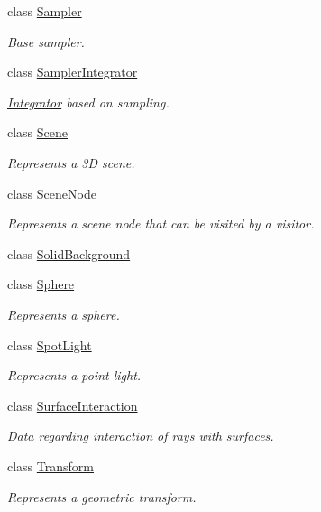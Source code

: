 \begin{DoxyCompactItemize}
class \mbox{\hyperlink{classomg_1_1_sampler}{Sampler}}
\begin{DoxyCompactList}\small\item\em Base sampler. \end{DoxyCompactList}\item 
class \mbox{\hyperlink{classomg_1_1_sampler_integrator}{Sampler\+Integrator}}
\begin{DoxyCompactList}\small\item\em \mbox{\hyperlink{classomg_1_1_integrator}{Integrator}} based on sampling. \end{DoxyCompactList}\item 
class \mbox{\hyperlink{classomg_1_1_scene}{Scene}}
\begin{DoxyCompactList}\small\item\em Represents a 3D scene. \end{DoxyCompactList}\item 
class \mbox{\hyperlink{classomg_1_1_scene_node}{Scene\+Node}}
\begin{DoxyCompactList}\small\item\em Represents a scene node that can be visited by a visitor. \end{DoxyCompactList}\item 
class \mbox{\hyperlink{classomg_1_1_solid_background}{Solid\+Background}}
\item 
class \mbox{\hyperlink{classomg_1_1_sphere}{Sphere}}
\begin{DoxyCompactList}\small\item\em Represents a sphere. \end{DoxyCompactList}\item 
class \mbox{\hyperlink{classomg_1_1_spot_light}{Spot\+Light}}
\begin{DoxyCompactList}\small\item\em Represents a point light. \end{DoxyCompactList}\item 
class \mbox{\hyperlink{classomg_1_1_surface_interaction}{Surface\+Interaction}}
\begin{DoxyCompactList}\small\item\em Data regarding interaction of rays with surfaces. \end{DoxyCompactList}\item 
class \mbox{\hyperlink{classomg_1_1_transform}{Transform}}
\begin{DoxyCompactList}\small\item\em Represents a geometric transform. \end{DoxyCompactList}\item 

\end{DoxyCompactItemize}
